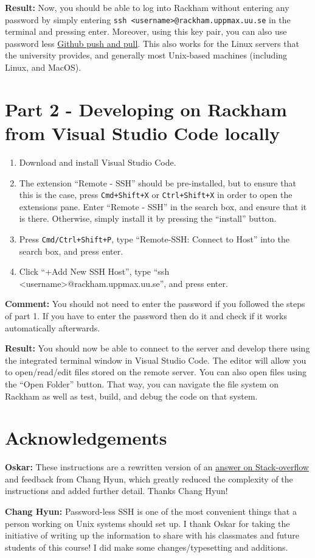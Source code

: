 \documentclass[10pt]{article}
\begin{document}
\textbf{Result:} Now, you should be able to log into Rackham without entering any password by simply entering
\texttt{ssh <username>@rackham.uppmax.uu.se} in the terminal and pressing enter. Moreover, using this key pair,
you can also use password less \href{https://docs.github.com/en/authentication/connecting-to-github-with-ssh/adding-a-new-ssh-key-to-your-github-account}
{Github push and pull}.
This also works for the Linux servers that the university provides, and generally most Unix-based
machines (including Linux, and MacOS).

\section{Part 2 - Developing on Rackham from Visual Studio Code locally}
\begin{enumerate}
\item Download and install Visual Studio Code.
\item The extension “Remote - SSH” should be pre-installed, but to ensure that this is the case, press
\texttt{Cmd+Shift+X} or \texttt{Ctrl+Shift+X} in order to open the extensions pane. Enter “Remote - SSH” in the search box, and
ensure that it is there. Otherwise, simply install it by pressing the “install” button.
\item Press \texttt{Cmd/Ctrl+Shift+P}, type “Remote-SSH: Connect to Host” into the search box, and press enter.
\item Click “+Add New SSH Host”, type “ssh <username>@rackham.uppmax.uu.se”, and press enter.
\end{enumerate}

\textbf{Comment:} You should not need to enter the password if you followed the steps of part 1. If you have
to enter the password then do it and check if it works automatically afterwards.

\textbf{Result:} You should now be able to connect to the server and develop there using the integrated
terminal window in Visual Studio Code. The editor will allow you to open/read/edit files stored on
the remote server. You can also open files using the “Open Folder” button. That
way, you can navigate the file system on Rackham as well as test, build, and debug the code on that
system. 

\section{Acknowledgements}
\textbf{Oskar:} These instructions are a rewritten version of an
\href{https://stackoverflow.com/a/69970152/754562}{answer on Stack-overflow} and feedback from Chang
Hyun, which greatly reduced the complexity of the instructions and added further detail. Thanks
Chang Hyun!

\noindent\textbf{Chang Hyun:} Password-less SSH is one of the most convenient things that a person working on
Unix systems should set up. I thank Oskar for taking the initiative of writing up the information
to share with his classmates and future students of this course! I did make some changes/typesetting
and additions.
\end{document}
